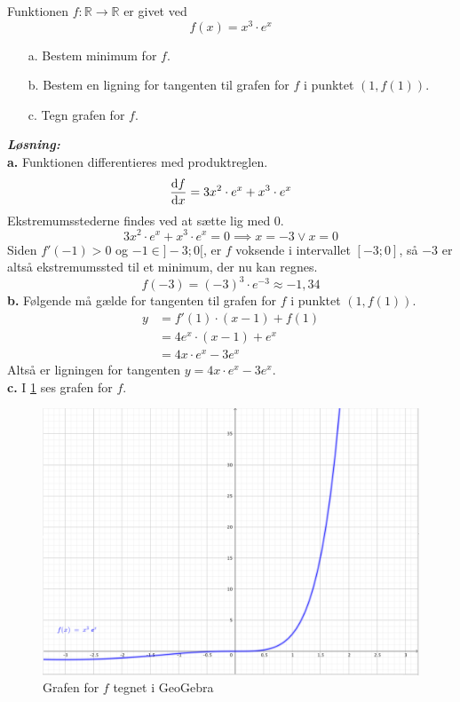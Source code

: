 \documentclass{article}
\newcommand{\sol}{\setlength{\parindent}{0cm}\textbf{\textit{Løsning:}}\setlength{\parindent}{1cm}}
\begin{document}
\begin{question}{}{}
   Funktionen $f:\mathbb{R} \to \mathbb{R}$ er givet ved
  \[
  f(x)= x^3 \cdot e^x
  \] 
  \begin{itemize}
    \item[a.] Bestem minimum for $f$.
    \item[b.] Bestem en ligning for tangenten til grafen for $f$ i punktet $\left(1,f(1)\right)$.
    \item[c.] Tegn grafen for $f$.
  \end{itemize}
\end{question}
\sol \\ 
\textbf{a.} Funktionen differentieres med produktreglen.
\[
\dv{f}{x}=3x^2\cdot e^x + x^3\cdot e^x
\] 
Ekstremumsstederne findes ved at sætte lig med 0.
\[
3x^2\cdot e^x + x^3\cdot e^x=0 \implies x=-3 \lor x=0
\] 
Siden $f'(-1)>0$ og $-1 \in ]-3;0[$, er $f$ voksende i intervallet $[-3;0]$, så $-3$ er altså ekstremumssted til et minimum, der nu kan regnes.
\[
f(-3)=(-3)^3\cdot e^{-3}\approx -1,34 
\] 
\textbf{b.} Følgende må gælde for tangenten til grafen for $f$ i punktet $\left(1,f(1)\right)$.
\begin{equation*}
\begin{split}
  y&=f'(1)\cdot (x-1)+f(1)\\ 
  &= 4e^x\cdot (x-1) + e^x\\ 
  &= 4x\cdot e^x -3e^x
\end{split}
\end{equation*}
Altså er ligningen for tangenten $y=4x\cdot e^x -3e^x$.\\[1ex]
\textbf{c.} I \cref{fig:2} ses grafen for $f$.
\begin{figure}[H]
\begin{center}
  \includegraphics[scale=0.3]{Mat18_2.png}
\end{center}
\caption{Grafen for $f$ tegnet i GeoGebra}
\label{fig:2}
\end{figure}
\end{document}
